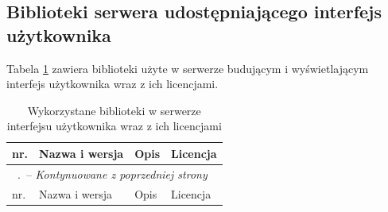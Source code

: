 \documentclass[a4paper,11pt,twoside]{report}
\renewcommand*{\thetable}{\arabic{chapter}.\arabic{table}}
\theoremstyle{definition}
\begin{document}
        \subsection{Biblioteki serwera udostępniającego interfejs użytkownika}
        Tabela \ref{biblioteki-frontend} zawiera biblioteki użyte w serwerze budującym i wyświetlającym interfejs użytkownika wraz z ich licencjami.
        
        \begin{longtable}{| p{} | p{} | p{} | p{} |}
            \caption{Wykorzystane biblioteki w serwerze interfejsu użytkownika wraz z ich licencjami}
            \label{biblioteki-frontend} \\
            \hline
            nr. & Nazwa i wersja & Opis & Licencja \\ \hline
            \endfirsthead
            \multicolumn{4}{l}{\footnotesize \tablename\ \thetable\ -- \textit{Kontynuowane z poprzedniej strony}} \\
            \hline
            nr. & Nazwa i wersja & Opis & Licencja \\ \hline
            \endhead
            

\end{longtable}
\end{document}

